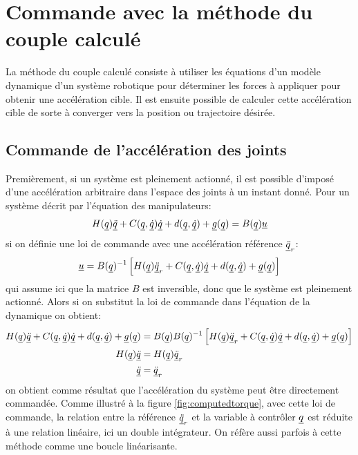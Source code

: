 \section{Commande avec la méthode du couple calculé}

La méthode du couple calculé consiste à utiliser les équations d'un modèle dynamique d'un système robotique pour déterminer les forces à appliquer pour obtenir une accélération cible. Il est ensuite possible de calculer cette accélération cible de sorte à converger vers la position ou trajectoire désirée.



\subsection{Commande de l'accélération des joints}

Premièrement, si un système est pleinement actionné, il est possible d'imposé d'une accélération arbitraire dans l'espace des joints à un instant donné. Pour un système décrit par l'équation des manipulateurs:
\begin{align}
H(\underline{q}) \underline{\ddot{q}} + C(\underline{q},\underline{\dot{q}}) \underline{\dot{q}} + d(\underline{q}, \underline{\dot{q}}) + \underline{g}(\underline{q}) = B(\underline{q}) \underline{u} 
\end{align}
si on définie une loi de commande avec une accélération référence $\underline{\ddot{q}}_r$:
\begin{align}
\underline{u} = B(\underline{q})^{-1} \left[  H(\underline{q}) \underline{\ddot{q}}_r + C(\underline{q},\underline{\dot{q}}) \underline{\dot{q}} + d(\underline{q}, \underline{\dot{q}}) + \underline{g}(\underline{q}) \right]
\end{align}
qui assume ici que la matrice $B$ est inversible, donc que le système est pleinement actionné. Alors si on substitut la loi de commande dans l'équation de la dynamique on obtient:
\begin{align}
H(\underline{q}) \underline{\ddot{q}} + C(\underline{q},\underline{\dot{q}}) \underline{\dot{q}} + d(\underline{q}, \underline{\dot{q}}) + \underline{g}(\underline{q}) &= B(\underline{q}) B(\underline{q})^{-1} \left[  H(\underline{q}) \underline{\ddot{q}}_r + C(\underline{q},\underline{\dot{q}}) \underline{\dot{q}} + d(\underline{q}, \underline{\dot{q}}) + \underline{g}(\underline{q}) \right]  \\
H(\underline{q}) \underline{\ddot{q}} &= H(\underline{q}) \underline{\ddot{q}}_r \\
\underline{\ddot{q}} &= \underline{\ddot{q}}_r
\end{align}
on obtient comme résultat que l'accélération du système peut être directement commandée. Comme illustré à la figure \ref{fig:computedtorque}, avec cette loi de commande, la relation entre la référence $\underline{\ddot{q}}_r$ et la variable à contrôler $\underline{q}$ est réduite à une relation linéaire, ici un double intégrateur. On réfère aussi parfois à cette méthode comme une boucle linéarisante.

